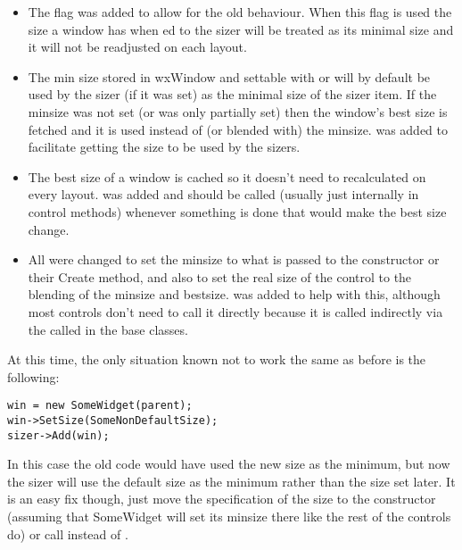 \begin{itemize}\itemsep=0pt
\item The  flag was added to allow for the old
      behaviour.  When this flag is used the size a window has when
      ed to the sizer will be treated as its minimal size and it
      will not be readjusted on each layout.

\item The min size stored in wxWindow and settable with  or
       will by default be used by the sizer (if it was set)
      as the minimal size of the sizer item.  If the minsize was not
      set (or was only partially set) then the window's best size is
      fetched and it is used instead of (or blended with) the minsize.
       was added to facilitate getting the
      size to be used by the sizers.

\item The best size of a window is cached so it doesn't need to
      recalculated on every layout.  was
      added and should be called (usually just internally in control
      methods) whenever something is done that would make the best
      size change.

\item All  were changed to set the minsize to what is passed
      to the constructor or their Create method, and also to set the real
      size of the control to the blending of the minsize and bestsize.
       was added to help with this,
      although most controls don't need to call it directly because it
      is called indirectly via the  called in the base
      classes.
\end{itemize}

  At this time, the only situation known not to work the same as
  before is the following:

\begin{verbatim}
win = new SomeWidget(parent);
win->SetSize(SomeNonDefaultSize);
sizer->Add(win);
\end{verbatim}

  In this case the old code would have used the new size as the
  minimum, but now the sizer will use the default size as the minimum
  rather than the size set later.  It is an easy fix though, just move
  the specification of the size to the constructor (assuming that
  SomeWidget will set its minsize there like the rest of the controls
  do) or call  instead of .

